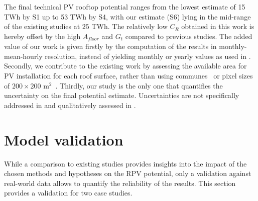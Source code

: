 The final technical PV rooftop potential ranges from the lowest estimate of 15 TWh by S1 up to 53 TWh by S4, with our estimate (S6) lying in the mid-range of the existing studies at $25$ TWh. 
The relatively low $C_R$ obtained in this work is hereby offset by the high $A_\mathit{floor}$ and $G_t$ compared to previous studies.
%
The added value of our work is given firstly by the computation of the results in monthly-mean-hourly resolution, instead of yielding monthly or yearly values as used in \cite{klauser_solarpotentialanalyse_2016, assouline_quantifying_2017, assouline_large-scale_2018}. Secondly, we contribute to the existing work by assessing the available area for PV installation for each roof surface, rather than using communes~\cite{assouline_quantifying_2017} or pixel sizes of $200 \times 200$ m$^2$~\cite{assouline_large-scale_2018}. Thirdly, our study is the only one that quantifies the uncertainty on the final potential estimate. 
Uncertainties are not specifically addressed in \cite{assouline_quantifying_2017, assouline_large-scale_2018, iea_potential_2002} and qualitatively assessed in \cite{klauser_solarpotentialanalyse_2016, buffat_scalable_2018}.



\section{Model validation}
\label{solar_scenarios}

While a comparison to existing studies provides insights into the impact of the chosen methods and hypotheses on the RPV potential, 
only a validation against real-world data allows to quantify the reliability of the results.
This section provides a validation for two case studies.

